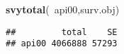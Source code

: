 \documentclass[]{article}
\newenvironment{Shaded}{\begin{snugshade}}{\end{snugshade}}
\newcommand{\KeywordTok}[1]{\textcolor[rgb]{0.13,0.29,0.53}{\textbf{{#1}}}}
\newcommand{\NormalTok}[1]{{#1}}
\begin{document}
\section{}\label{section}

\begin{Shaded}
\begin{Highlighting}[]
\KeywordTok{svytotal}\NormalTok{(~api00,surv.obj)}
\end{Highlighting}
\end{Shaded}

\begin{verbatim}
##         total    SE
## api00 4066888 57293
\end{verbatim}
\end{document}
